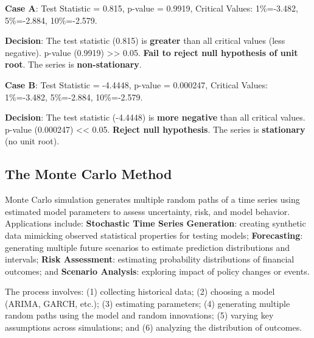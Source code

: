 \documentclass[11pt,a4paper]{article}
\begin{document}
\begin{tcolorbox}[colback=blue!5!white,colframe=blue!75!black,title=\textbf{Worked Example 12: ADF Test Interpretation}]
\textbf{Case A}: Test Statistic = 0.815, p-value = 0.9919, Critical Values: 1\%=-3.482, 5\%=-2.884, 10\%=-2.579.

\textbf{Decision}: The test statistic (0.815) is \textbf{greater} than all critical values (less negative). p-value (0.9919) >> 0.05. \textbf{Fail to reject null hypothesis of unit root}. The series is \textbf{non-stationary}.

\textbf{Case B}: Test Statistic = -4.4448, p-value = 0.000247, Critical Values: 1\%=-3.482, 5\%=-2.884, 10\%=-2.579.

\textbf{Decision}: The test statistic (-4.4448) is \textbf{more negative} than all critical values. p-value (0.000247) << 0.05. \textbf{Reject null hypothesis}. The series is \textbf{stationary} (no unit root).
\end{tcolorbox}

\subsection{The Monte Carlo Method}

Monte Carlo simulation generates multiple random paths of a time series using estimated model parameters to assess uncertainty, risk, and model behavior. Applications include: \textbf{Stochastic Time Series Generation}: creating synthetic data mimicking observed statistical properties for testing models; \textbf{Forecasting}: generating multiple future scenarios to estimate prediction distributions and intervals; \textbf{Risk Assessment}: estimating probability distributions of financial outcomes; and \textbf{Scenario Analysis}: exploring impact of policy changes or events.

The process involves: (1) collecting historical data; (2) choosing a model (ARIMA, GARCH, etc.); (3) estimating parameters; (4) generating multiple random paths using the model and random innovations; (5) varying key assumptions across simulations; and (6) analyzing the distribution of outcomes.
\end{document}
